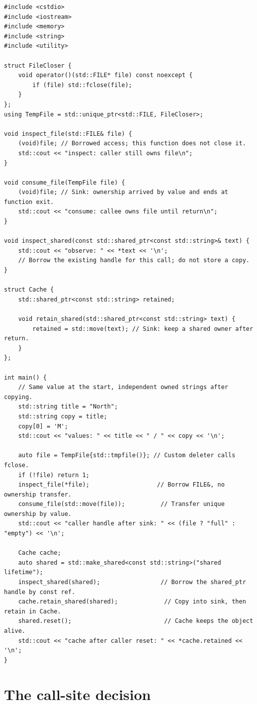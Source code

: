 \begin{verbatim}
#include <cstdio>
#include <iostream>
#include <memory>
#include <string>
#include <utility>

struct FileCloser {
    void operator()(std::FILE* file) const noexcept {
        if (file) std::fclose(file);
    }
};
using TempFile = std::unique_ptr<std::FILE, FileCloser>;

void inspect_file(std::FILE& file) {
    (void)file; // Borrowed access; this function does not close it.
    std::cout << "inspect: caller still owns file\n";
}

void consume_file(TempFile file) {
    (void)file; // Sink: ownership arrived by value and ends at function exit.
    std::cout << "consume: callee owns file until return\n";
}

void inspect_shared(const std::shared_ptr<const std::string>& text) {
    std::cout << "observe: " << *text << '\n';
    // Borrow the existing handle for this call; do not store a copy.
}

struct Cache {
    std::shared_ptr<const std::string> retained;

    void retain_shared(std::shared_ptr<const std::string> text) {
        retained = std::move(text); // Sink: keep a shared owner after return.
    }
};

int main() {
    // Same value at the start, independent owned strings after copying.
    std::string title = "North";
    std::string copy = title;
    copy[0] = 'M';
    std::cout << "values: " << title << " / " << copy << '\n';

    auto file = TempFile{std::tmpfile()}; // Custom deleter calls fclose.
    if (!file) return 1;
    inspect_file(*file);                   // Borrow FILE&, no ownership transfer.
    consume_file(std::move(file));          // Transfer unique ownership by value.
    std::cout << "caller handle after sink: " << (file ? "full" : "empty") << '\n';

    Cache cache;
    auto shared = std::make_shared<const std::string>("shared lifetime");
    inspect_shared(shared);                 // Borrow the shared_ptr handle by const ref.
    cache.retain_shared(shared);             // Copy into sink, then retain in Cache.
    shared.reset();                          // Cache keeps the object alive.
    std::cout << "cache after caller reset: " << *cache.retained << '\n';
}
\end{verbatim}

\section{The call-site decision}\label{05-engine-i-ch003-the-call-site-decision}

